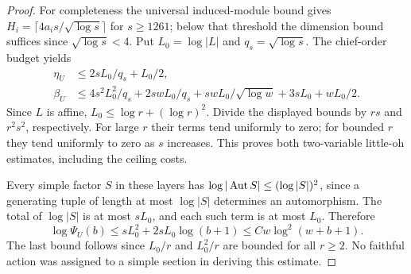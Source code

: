 \begin{proof}
For completeness the universal induced-module bound
\cite[Corollary~4.27(iii)]{Tracey2018} gives
$H_i=\lceil4a_is/\sqrt{\log s}\rceil$ for $s\geq1261$;
below that threshold the dimension bound suffices since
$\sqrt{\log s}<4$. Put $L_0=\log|L|$ and $q_s=\sqrt{\log s}$.
The chief-order budget yields
\begin{align*}
 \eta_U&\leq2sL_0/q_s+L_0/2,\\
 \beta_U&\leq4s^2L_0^2/q_s+2swL_0/q_s
       +swL_0/\sqrt{\log w}+3sL_0+wL_0/2.
\end{align*}
Since $L$ is affine, $L_0\leq\log r+(\log r)^2$.
Divide the displayed bounds by $rs$ and $r^2s^2$, respectively.
For large $r$ their terms tend uniformly to zero; for bounded $r$
they tend uniformly to zero as $s$ increases. This proves both
two-variable little-oh estimates, including the ceiling costs.

Every simple factor $S$ in these layers has
$\log|\operatorname{Aut} S|\leq(\log|S|)^2$, since a generating tuple
of length at most $\log|S|$ determines an automorphism.
The total of $\log|S|$ is at most $sL_0$, and each such term
is at most $L_0$. Therefore
\[
 \log\Psi_U(b)\leq sL_0^2+2sL_0\log(b+1)
                    \leq Cw\log^2(w+b+1).
\]
The last bound follows since $L_0/r$ and $L_0^2/r$ are bounded
for all $r\geq2$. No faithful action was assigned to a simple
section in deriving this estimate.
\end{proof}
